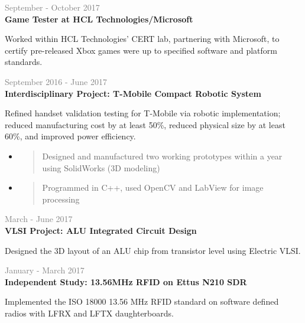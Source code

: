 \documentclass[letterpage]{article}
\begin{document}
\begin{minipage}[t]{0.63\linewidth}
\vspace{7px}
\textcolor{gray}{September - October 2017}\\
\textbf{\textsf{Game Tester at HCL Technologies/Microsoft}}\\
\raggedright
Worked within HCL Technologies' CERT lab, partnering with
Microsoft, to certify pre-released Xbox games were
up to specified software and platform standards.

\vspace{7px}
\textcolor{gray}{September 2016 - June 2017}
\textcolor{schauss-pink}{}
\\
\textbf{\textsf{Interdisciplinary Project:
		T-Mobile Compact Robotic System}}\\
\raggedright
Refined handset validation testing for T-Mobile via robotic
implementation;\\reduced manufacturing cost by at least 50\%,
reduced physical size by at least 60\%, and improved
power efficiency.\\
\begin{itemize}[leftmargin=*,labelindent=1mm,labelsep=0mm]
\item
  \begin{quote}
  \raggedright
  Designed and manufactured two working prototypes within
  a year using SolidWorks (3D modeling)
  \end{quote}
\item
  \begin{quote}
  \raggedright
  Programmed in C++,
  used OpenCV and LabView for image processing
  \end{quote}
\end{itemize}

\vspace{7px}
\textcolor{gray}{March - June 2017}\\
\textbf{\textsf{VLSI Project: ALU Integrated Circuit Design}}\\
\raggedright
Designed the 3D layout of an ALU chip from transistor level
using Electric VLSI.

\vspace{7px}
\textcolor{gray}{January - March 2017}\\
\textbf{\textsf{Independent Study: 13.56MHz RFID on Ettus N210 SDR}}\\
\raggedright
Implemented the ISO 18000 13.56 MHz RFID standard on software defined
radios with LFRX and LFTX daughterboards.


\end{minipage}
\end{document}
